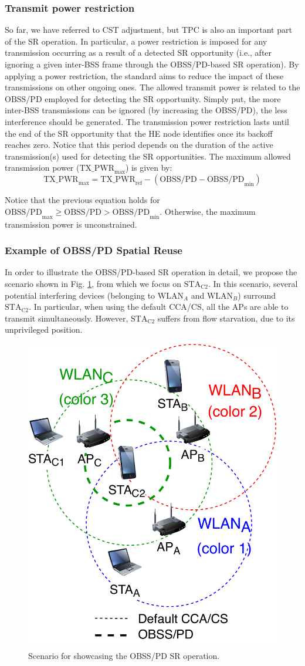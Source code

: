 \documentclass[preprint,12pt]{elsarticle}
\begin{document}
	\subsubsection{Transmit power restriction}	\label{section:tx_power_restriction}
	So far, we have referred to CST adjustment, but TPC is also an important part of the SR operation. In particular, a power restriction is imposed for any transmission occurring as a result of a detected SR opportunity (i.e., after ignoring a given inter-BSS frame through the OBSS/PD-based SR operation). By applying a power restriction, the standard aims to reduce the impact of these transmissions on other ongoing ones. The allowed transmit power is related to the $\text{OBSS/PD}$ employed for detecting the SR opportunity. Simply put, the more inter-BSS transmissions can be ignored (by increasing the OBSS/PD), the less interference should be generated. The transmission power restriction lasts until the end of the SR opportunity that the HE node identifies once its backoff reaches zero. Notice that this period depends on the duration of the active transmission(s) used for detecting the SR opportunities. The maximum allowed transmission power ($\text{TX\_PWR}_{\max}$) is given by:
	\begin{equation}
	\text{TX\_PWR}_{\max} = \text{TX\_PWR}_{\text{ref}} - (\text{OBSS/PD} -\text{OBSS/PD}_{\min})
	\label{eq:power_restriction}
	\end{equation}
	
	Notice that the previous equation holds for $\text{OBSS/PD}_{\max} \geq \text{OBSS/PD} > \text{OBSS/PD}_{\min}$. Otherwise, the maximum transmission power is unconstrained.
	
	\subsubsection{Example of OBSS/PD Spatial Reuse}
	In order to illustrate the OBSS/PD-based SR operation in detail, we propose the scenario shown in Fig. \ref{fig:fig_8_a}, from which we focus on $\text{STA}_\text{C2}$. In this scenario, several potential interfering devices (belonging to $\text{WLAN}_A$ and $\text{WLAN}_B$) surround $\text{STA}_\text{C2}$. In particular, when using the default CCA/CS, all the APs are able to transmit simultaneously. However, $\text{STA}_\text{C2}$ suffers from flow starvation, due to its unprivileged position.
	\begin{figure}[ht!]
		\centering
		\includegraphics[width=0.3\columnwidth]{fig_11}
		\caption{Scenario for showcasing the OBSS/PD SR operation.}
		\label{fig:fig_8_a}
	\end{figure}
	
\end{document}
